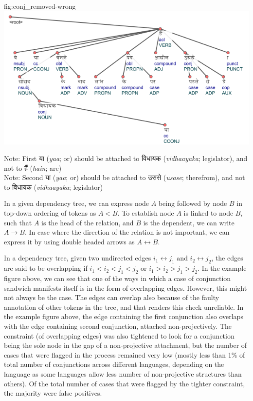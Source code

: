 \begin{reusefigure}[H]{fig:conj_removed-wrong}
    \centering
    \includegraphics[scale=0.85]{img/removed-conj-wrong.png}
    \caption{Original Annotation for Example \ref{examp:conj_removed}}
    Note: First \texthindi{या} (\textit{yaa}; or) should be attached to \texthindi{विधायक} (\textit{vidhaayaka}; legislator), and not to \texthindi{हैं} (\textit{hain}; are)\\
  Note: Second \texthindi{या} (\textit{yaa}; or) should be attached to \texthindi{उससे} (\textit{usase}; therefrom), and not to \texthindi{विधायक} (\textit{vidhaayaka}; legislator)
\end{reusefigure}

In a given dependency tree, we can express node $A$ being followed by node $B$ in top-down ordering of tokens as $A < B$. To establish node $A$ is linked to node $B$, such that $A$ is the head of the relation, and $B$ is the dependent, we can write $A \rightarrow B$. In case where the direction of the relation is not important, we can express it by using double headed arrows as $A \leftrightarrow B$. 

In a dependency tree, given two undirected edges $i_{1} \leftrightarrow j_{1} \text{ and } i_{2} \leftrightarrow j_{2}$, the edges are said to be overlapping if $i_{1} < i_{2} < j_{1} < j_{2}$ or $i_{1} > i_{2} > j_{1} > j_{2}$. In the example figure above, we can see that one of the ways in which a case of conjunction sandwich manifests itself is in the form of overlapping edges. However, this might not always be the case. The edges can overlap also because of the faulty annotation of other tokens in the tree, and that renders this check unreliable. In the example figure above, the edge containing the first conjunction also overlaps with the edge containing second conjunction, attached non-projectively. The constraint (of overlapping edges) was also tightened to look for a conjunction being the sole node in the gap of a non-projective attachment, but the number of cases that were flagged in the process remained very low (mostly less than 1\% of total number of conjunctions across different languages, depending on the language as some languages allow less number of non-projective structures than others). Of the total number of cases that were flagged by the tighter constraint, the majority were false positives.

